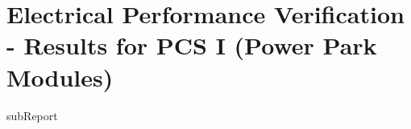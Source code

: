\renewcommand{\DTRPcs}{IPPM} %
\renewcommand{\DTRPcsLong}{I (Power Park Modules)}


    \section{Electrical Performance Verification - Results for PCS \DTRPcsLong}

    {{subReport}}
    \newpage

